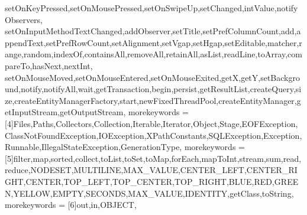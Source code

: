 {{    setOnKeyPressed,setOnMousePressed,setOnSwipeUp,setChanged,intValue,notifyObservers, setOnInputMethodTextChanged,addObserver,setTitle,setPrefColumnCount,add,appendText,setPrefRowCount,setAlignment,setVgap,setHgap,setEditable,matcher,range,random,indexOf,containsAll,removeAll,retainAll,asList,readLine,toArray,compareTo,hasNext,nextInt,%
    setOnMouseMoved,setOnMouseEntered,setOnMouseExited,getX,getY,setBackground,notify,notifyAll,wait,getTransaction,begin,persist,getResultList,createQuery,size,createEntityManagerFactory,start,newFixedThreadPool,createEntityManager,getInputStream,getOutputStream},
    morekeywords = [4]{Files,Paths,Collectors,Collection,Iterable,Iterator,Object,Stage,EOFException,ClassNotFoundException,IOException,XPathConstants,SQLException,Exception,Runnable,IllegalStateException,GenerationType},
    morekeywords = [5]{filter,map,sorted,collect,toList,toSet,toMap,forEach,mapToInt,stream,sum,read,reduce,NODESET,MULTILINE,MAX_VALUE,CENTER_LEFT,CENTER_RIGHT,CENTER,TOP_LEFT,TOP_CENTER,TOP_RIGHT,BLUE,RED,GREEN,YELLOW,EMPTY,SECONDS,MAX_VALUE,IDENTITY,getClass,toString},
    morekeywords = [6]{out,in,OBJECT},
}




